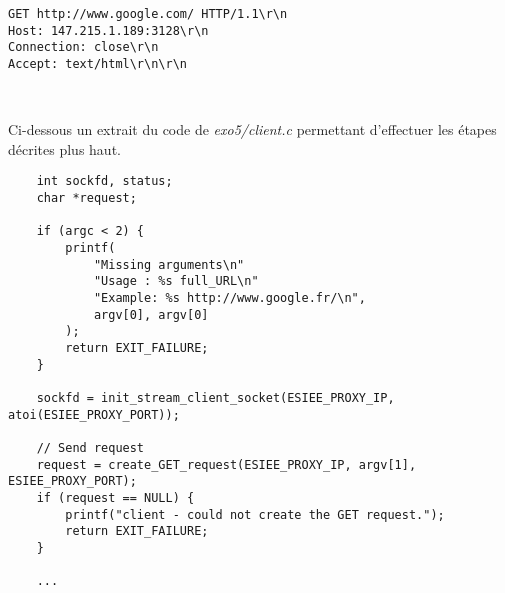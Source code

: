 \documentclass[a4paper, frenchb, 11pt]{article}
\begin{document}
\begin{lstlisting}[caption=Exemple de requête en passant par le proxy de l'ESIEE]
GET http://www.google.com/ HTTP/1.1\r\n
Host: 147.215.1.189:3128\r\n
Connection: close\r\n
Accept: text/html\r\n\r\n
\end{lstlisting}
\

\noindent Ci-dessous un extrait du code de \emph{exo5/client.c} permettant d'effectuer les étapes décrites plus haut.

\begin{lstlisting}
    int sockfd, status;
    char *request;

    if (argc < 2) {
        printf(
            "Missing arguments\n"
            "Usage : %s full_URL\n"
            "Example: %s http://www.google.fr/\n",
            argv[0], argv[0]
        );
        return EXIT_FAILURE;
    }

    sockfd = init_stream_client_socket(ESIEE_PROXY_IP, atoi(ESIEE_PROXY_PORT));

    // Send request
    request = create_GET_request(ESIEE_PROXY_IP, argv[1], ESIEE_PROXY_PORT);
    if (request == NULL) {
        printf("client - could not create the GET request.");
        return EXIT_FAILURE;
    }

    ...
\end{lstlisting}


\newpage

\renewcommand\refname{Ressources utilisées}
\begin{thebibliography}{5} %
\end{thebibliography}
\end{document}
